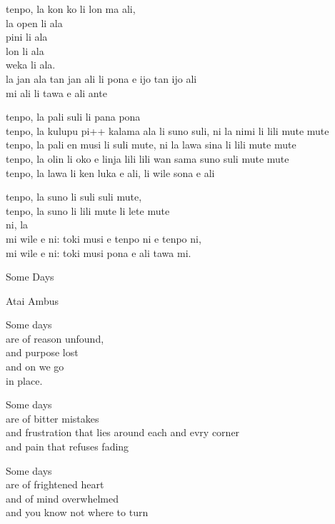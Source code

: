\documentclass{article}
\begin{document}
    tenpo, la kon ko li lon ma ali, \\
    la open li ala \\
    pini li ala \\
    lon li ala \\
    weka li ala. \\
    la jan ala tan jan ali li pona e ijo tan ijo ali \\
    mi ali li tawa e ali ante

    tenpo, la pali suli li pana pona \\
    tenpo, la kulupu pi++ kalama ala li suno suli, ni la nimi li lili mute mute \\
    tenpo, la pali en musi li suli mute, ni la lawa sina li lili mute mute \\
    tenpo, la olin li oko e linja lili lili wan sama suno suli mute mute \\
    tenpo, la lawa li ken luka e ali, li wile sona e ali

    \bigskip

    tenpo, la suno li suli suli mute, \\
    tenpo, la suno li lili mute li lete mute \\
    ni, la \\
    mi wile e ni: toki musi e tenpo ni e tenpo ni, \\
    mi wile e ni: toki musi pona e ali tawa mi.


    \pagebreak


        \begin{center}
          {\huge Some Days} \par
          {\Large Atai Ambus}
        \end{center}


        Some days \\
        are of reason unfound, \\
        and purpose lost \\
        and on we go \\
        in place.

        Some days \\
        are of bitter mistakes \\
        and frustration that lies around each and evry corner \\
        and pain that refuses fading

        Some days \\
        are of frightened heart \\
        and of mind overwhelmed \\
        and you know not where to turn
\end{document}
